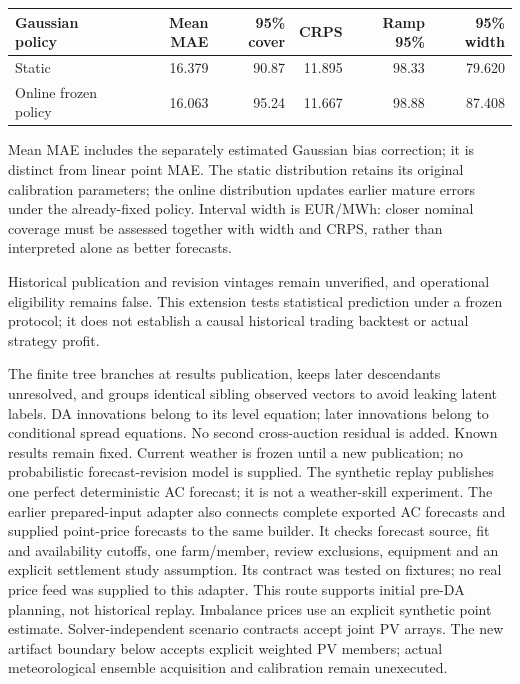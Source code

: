 \documentclass[11pt,a4paper]{article}
\begin{document}
{\small\begin{longtable}{lrrrrr}
\toprule Gaussian policy & Mean MAE & 95\% cover & CRPS & Ramp 95\% & 95\% width \\ \midrule
\endhead
Static & 16.379 & 90.87 & 11.895 & 98.33 & 79.620 \\
Online frozen policy & 16.063 & 95.24 & 11.667 & 98.88 & 87.408 \\
\bottomrule\end{longtable}}
Mean MAE includes the separately estimated Gaussian bias correction; it is distinct from linear point MAE. The static distribution retains its original calibration parameters; the online distribution updates earlier mature errors under the already-fixed policy. Interval width is EUR/MWh: closer nominal coverage must be assessed together with width and CRPS, rather than interpreted alone as better forecasts.

Historical publication and revision vintages remain unverified, and operational eligibility remains false. This extension tests statistical prediction under a frozen protocol; it does not establish a causal historical trading backtest or actual strategy profit.


The finite tree branches at results publication, keeps later descendants unresolved,
and groups identical sibling observed vectors to avoid leaking latent labels.
DA innovations belong to its level equation; later innovations belong to
conditional spread equations. No second cross-auction residual is added. Known
results remain fixed. Current weather is frozen until a new publication; no
probabilistic forecast-revision model is supplied. The synthetic replay publishes
one perfect deterministic AC forecast; it is not a weather-skill experiment.
The earlier prepared-input adapter also connects complete exported AC forecasts and supplied
point-price forecasts to the same builder. It checks forecast source, fit and
availability cutoffs, one farm/member, review exclusions, equipment and an explicit
settlement study assumption. Its contract was tested on fixtures; no real price feed
was supplied to this adapter. This route supports initial pre-DA planning, not historical replay.
Imbalance prices use an explicit synthetic point estimate. Solver-independent
scenario contracts accept joint PV arrays. The new artifact boundary below accepts
explicit weighted PV members; actual meteorological ensemble acquisition and
calibration remain unexecuted.
\end{document}
